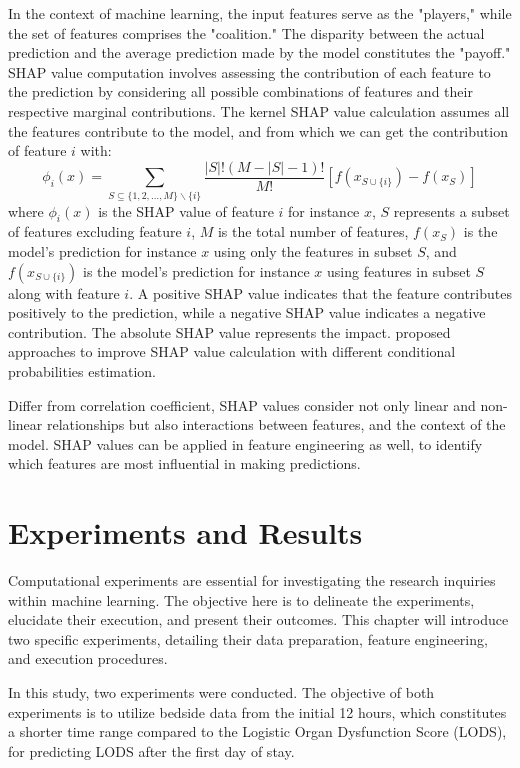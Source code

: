 \documentclass[12pt,a4paper,english
]{tunithesis}
\begin{document}
In the context of machine learning, the input features serve as the "players," while the set of features comprises the "coalition." The disparity between the actual prediction and the average prediction made by the model constitutes the "payoff." SHAP value computation involves assessing the contribution of each feature to the prediction by considering all possible combinations of features and their respective marginal contributions. The kernel SHAP value calculation assumes all the features contribute to the model, and from which we can get the contribution of feature $i$ with:
\begin{equation}
    \phi_i(x)=\sum_{S \subseteq\{1,2, \ldots, M\} \backslash\{i\}} \frac{|S| !(M-|S|-1) !}{M !}\left[f\left(x_{S \cup\{i\}}\right)-f\left(x_S\right)\right]
\end{equation}
where $\phi_i(x)$ is the SHAP value of feature $i$ for instance $x$, $S$ represents a subset of features excluding feature $i$, $M$ is the total number of features, $f(x_S)$  is the model's prediction for instance $x$ using only the features in subset $S$, and $f\left(x_{S \cup\{i\}}\right)$ is the model's prediction for instance $x$ using features in subset $S$ along with feature $i$. A positive SHAP value indicates that the feature contributes positively to the prediction, while a negative SHAP value indicates a negative contribution. The absolute SHAP value represents the impact. \textcite{aas2020} proposed approaches to improve SHAP value calculation with different conditional probabilities estimation. 

Differ from correlation coefficient, SHAP values consider not only linear and non-linear relationships but also interactions between features, and the context of the model. SHAP values can be applied in feature engineering as well, to identify which features are most influential in making predictions.
 
\chapter{Experiments and Results}
\label{ch:experiment}
Computational experiments are essential for investigating the research inquiries within machine learning. The objective here is to delineate the experiments, elucidate their execution, and present their outcomes. This chapter will introduce two specific experiments, detailing their data preparation, feature engineering, and execution procedures.

In this study, two experiments were conducted. The objective of both experiments is to utilize bedside data from the initial 12 hours, which constitutes a shorter time range compared to the Logistic Organ Dysfunction Score (LODS), for predicting LODS after the first day of stay.
\end{document}

